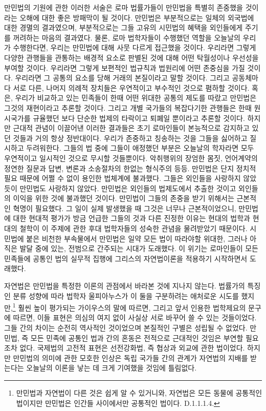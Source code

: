 만민법의 기원에 관한 이러한 서술은
로마 법률가들이 만민법을 특별히 존중했을 것이라는 오해에 대한
좋은 방패막이 될 것이다.
만민법은 부분적으로는 일체의 외국법에 대한 경멸의 결과였으며,
부분적으로는 그들 고유의 시민법의 혜택을 외인들에게 주기를 꺼려하는
마음의 결과였다.
물론, 로마 법학자들이 수행했던 역할을 오늘날의 우리가 수행한다면,
우리는 만민법에 대해 사뭇 다르게 접근했을 것이다.
우리라면 그렇게 다양한 관행들을 관통하는 배경적 요소로 판별된 것에 대해
어떤 탁월성이나 우선성을 부여할 것이다.
우리라면 그렇게 보편적인 법규칙과 법원리에 어떤 존중심을 가질 것이다.
우리라면 그 공통의 요소를 당해 거래의 본질이라고 말할 것이다.
그리고 공동체마다 서로 다른, 나머지 의례적 장치들은
우연적이고 부수적인 것으로 폄하할 것이다.
혹은, 우리가 비교하고 있는 민족들이 한때 어떤 위대한 공통의 제도를
따랐고 만민법은 그것의 재현이라고 추론할 것이다.
그리고 개별 국가들의 복잡다기한 관행들은 한때 원시국가를 규율했던
보다 단순한 법제의 타락이고 퇴폐일 뿐이라고 추론할 것이다.
하지만 근대적 관념이 이끌어낸 이러한 결과들은
초기 로마인들이 본능적으로 감지하고 있던 것들과
거의 항상 정반대이다.
우리가 존중하고 칭송하는 것을 그들을 싫어하고 질시하고 두려워한다.
그들의 법 중에 그들이 애정했던 부분은
오늘날의 학자라면 모두 우연적이고 일시적인 것으로 무시할 것들뿐이다.
악취행위의 장엄한 몸짓, 언어계약의 정연한 질문과 답변,
변론과 소송절차의 한없는 형식주의 등등.
만민법은 단지 정치적 필요 때문에 어쩔 수 없이 용인한 법체계에 불과했다.
그들은 외인들을 사랑하지 않았듯이 만민법도 사랑하지 않았다.
만민법은 외인들의 법제도에서 추출한 것이고 외인들의 이익을 위한 것에 불과했던
것이다.
만민법이 그들의 존중을 받기 위해서는 근본적인 혁명이 필요했다.
그 일이 실제 발생했을 때 그것은 너무나 근본적이었으니,
만민법에 대한 현대적 평가가 방금 언급한 그들의 것과 다른 진정한 이유는
현대의 법학과 현대의 철학이
이 주제에 관한 후대 법학자들의 성숙한 관념을
물려받았기 때문이다.
시민법에 붙은 비천한 부속물에서
만민법은 일약 모든 법이 따라야할 위대한, 그러나 아직은 발달 중에 있는,
전범으로 간주되는 시대가 도래했다.
이 위기는
로마인들이
모든 민족들에 공통인 법의 실무적 집행에
그리스의 자연법이론을
적용하기 시작하면서 도래했다.

자연법은 만민법을 특정한 이론의 관점에서 바라본 것에
지나지 않는다.
법률가의 특징인 분류 성향에 따라
법학자 울피아누스가
이 둘을 구분하려는 애처로운 시도를 했지만,\footnote{%
  만민법과 자연법이 다른 것은 쉽게 알 수 있거니와,
  자연법은 모든 동물에 공통적인 법이지만 만민법은 인간들 사이에서만
  공통적인 법이다. D.1.1.1.4.}
훨씬 높이 평가되는 가이우스의 말에 따르면, 그리고
앞서 인용한 법학제요의 문구에 따르면,
이들 표현은 의심의 여지 없이 사실상 서로 바꾸어 쓸 수 있는 것들이었다.
그들 간의 차이는 순전히 역사적인 것이었으며
본질적인 구별은 성립될 수 없었다.
만민법, 즉 모든 민족에 공통인 법과
 간의 혼동은 전적으로 근대적인 것임은
부연할 필요조차 없다.
국제법의 고전적 표현은
선전강화법,
즉 협상과 외교에 관한 법이었다.
하지만 만민법의 의미에 관한 모호한 인상은
독립 국가들 간의 관계가 자연법의 지배를 받는다는 오늘날의 이론을
낳는 데 크게 기여했을 것임에 틀림없다.

